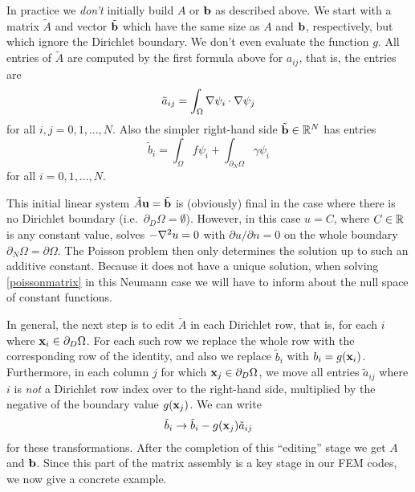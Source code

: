 In practice we \emph{don't} initially build $A$ or $\mathbf{b}$ as described above.  We start with a matrix $\tilde A$ and vector $\tilde {\mathbf{b}}$ which have the same size as $A$ and $\mathbf{b}$, respectively, but which ignore the Dirichlet boundary.  We don't even evaluate the function $g$.  All entries of $\tilde A$ are computed by the first formula above for $a_{ij}$, that is, the entries are
\begin{equation*}
\tilde a_{ij} = \int_\Omega \nabla \psi_i \cdot \nabla \psi_j
\end{equation*}
for all $i,j=0,1,\dots,N$.  Also the simpler right-hand side $\tilde {\mathbf{b}}\in\mathbb{R}^N$ has entries
    $$\tilde b_i = \int_\Omega f \psi_i + \int_{\partial_N\Omega} \gamma \psi_i$$
for all $i=0,1,\dots,N$.

This initial linear system $\tilde A\mathbf{u}=\tilde {\mathbf{b}}$ is (obviously) final in the case where there is no Dirichlet boundary (i.e.~$\partial_D \Omega=\emptyset$).  However, in this case $u=C$, where $C\in\mathbb{R}$ is any constant value, solves $-\nabla^2 u=0$ with $\partial u/\partial n = 0$ on the whole boundary $\partial_N \Omega = \partial \Omega$.  The Poisson problem then only determines the solution up to such an additive constant.  Because it does not have a unique solution, when solving \eqref{poissonmatrix} in this Neumann case we will have to inform \PETSc about the null space of constant functions.

In general, the next step is to edit $\tilde A$ in each Dirichlet row, that is, for each $i$ where $\mathbf{x}_i \in \partial_D \Omega$.  For each such row we replace the whole row with the corresponding row of the identity, and also we replace $\tilde b_i$ with $b_i = g(\mathbf{x}_i)$.  Furthermore, in each column $j$ for which $\mathbf{x}_j \in \partial_D \Omega$, we move all entries $\tilde a_{ij}$ where $i$ is \emph{not} a Dirichlet row index over to the right-hand side, multiplied by the negative of the boundary value $g(\mathbf{x}_{j})$.  We can write
\begin{equation}
    \tilde b_i \to \tilde b_i - g(\mathbf{x}_{j}) \tilde a_{ij} \label{btransform}
\end{equation}
for these transformations.  After the completion of this ``editing'' stage we get $A$ and $\mathbf{b}$.  Since this part of the matrix assembly is a key stage in our FEM codes, we now give a concrete example.

